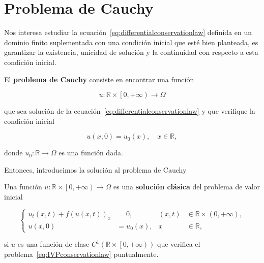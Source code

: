 \section{Problema de Cauchy}

Nos interesa estudiar la
ecuación~\eqref{eq:differentialconservationlaw} definida en un
dominio finito suplementada con una condición inicial que esté bien
planteada, es garantizar la existencia, unicidad de solución y la
continuidad con respecto a esta condición inicial.

\begin{definition}
  El \textbf{problema de Cauchy} consiste en encontrar una función

  \begin{equation*}
    u\colon\mathbb{R}\times
    \left[0,+\infty\right)\longrightarrow
    \Omega
  \end{equation*}

  que sea solución de la
  ecuación~\eqref{eq:differentialconservationlaw} y que verifique la
  condición inicial

  \begin{equation}\label{eq:initialcondition}
    u\left(x,0\right)=
    u_{0}\left(x\right),\quad
    x\in\mathbb{R},
  \end{equation}

  donde
  \begin{math}
    u_{0}\colon\mathbb{R}\to\Omega
  \end{math}
  es una función dada.
\end{definition}

Entonces, introducimos la solución al problema de Cauchy

\begin{definition}
  Una función
  \begin{math}
    u\colon\mathbb{R}\times
    \left[0,+\infty\right)\to
    \Omega
  \end{math}
  es una \textbf{solución clásica} del problema de valor inicial

  \begin{equation}\label{eq:IVPconservationlaw}
    \left\{
    \begin{aligned}
      u_{t}
      \left(x,t\right)+
      {f\left(u\left(x,t\right)\right)}_{x} & =
      0,
                                            &
      \left(x,t\right)                      & \in
      \mathbb{R}\times\left(0,+\infty\right),                \\
      u\left(x,0\right)                     & =
      u_{0}\left(x\right),                  &
      x                                     & \in\mathbb{R},
    \end{aligned}
    \right.
  \end{equation}

  si $u$ es una función de clase
  \begin{math}
    C^{1}
    \left(
    \mathbb{R}\times
    \left[0,+\infty\right)
    \right)
  \end{math}
  que verifica el problema~\eqref{eq:IVPconservationlaw}
  puntualmente.
\end{definition}

